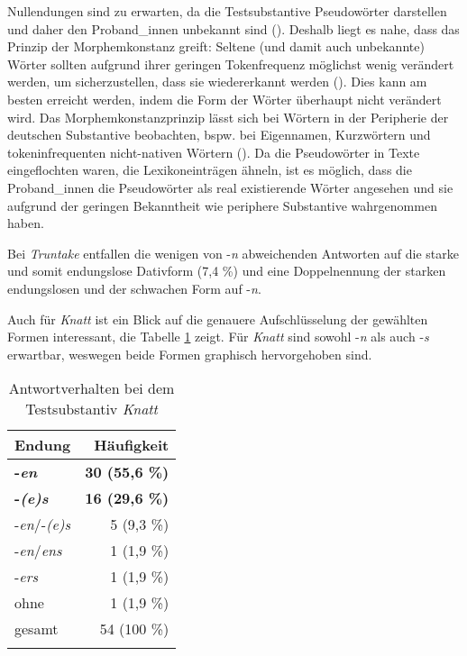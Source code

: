  
Nullendungen sind zu erwarten, da die Testsubstantive Pseudowörter darstellen und daher den Proband\_innen unbekannt sind (\cite[167]{Schmitt.2019}). Deshalb liegt es nahe, dass das Prinzip der Morphemkonstanz greift: Seltene (und damit auch unbekannte) Wörter sollten aufgrund ihrer geringen Tokenfrequenz möglichst wenig verändert werden, um sicherzustellen, dass sie wiedererkannt werden (\cite[150]{Ackermann.2017}). Dies kann am besten erreicht werden, indem die Form der Wörter überhaupt nicht verändert wird.  Das Morphemkonstanzprinzip lässt sich bei Wörtern in der Peripherie der deutschen Substantive beobachten, bspw. bei Eigennamen, Kurzwörtern und tokeninfrequenten nicht-nativen Wörtern (\cite[151--154]{Ackermann.2017}). Da die Pseudowörter in Texte eingeflochten waren, die Lexikoneinträgen ähneln, ist es möglich, dass die Proband\_innen die Pseudowörter als real existierende Wörter angesehen und sie aufgrund der geringen Bekanntheit wie periphere Substantive wahrgenommen haben. 

 
Bei \textit{Truntake} entfallen die wenigen von -\textit{n} abweichenden Antworten auf die starke und somit endungslose Dativform (7,4 \%) und eine Doppelnennung der starken endungslosen und der schwachen Form auf -\textit{n}.



Auch für \textit{Knatt} ist ein Blick auf die genauere Aufschlüsselung der gewählten Formen in\-teres\-sant, die Tabelle \ref{knatt} zeigt. Für \textit{Knatt} sind sowohl -\textit{n} als auch -\textit{s} erwartbar, weswegen beide Formen graphisch hervorgehoben sind. 

\begin{table}
\begin{tabular}{lr}
\lsptoprule
Endung  & Häufigkeit \\ 
\midrule
\textbf{-\textit{en}}  &  \textbf{30 (55,6 \%)} \\
\textbf{-\textit{(e)s}}  &  \textbf{16 (29,6 \%)} \\ 
-\textit{en}/-\textit{(e)s}  &   5 (9,3 \%) \\ 
-\textit{en}/\textit{ens} & 1 (1,9 \%)\\
-\textit{ers}  &   1 (1,9 \%) \\ 
ohne  &   1 (1,9 \%)\\
\midrule
gesamt  & 54 (100 \%) \\
\lspbottomrule
\end{tabular}
\caption{Antwortverhalten bei dem Testsubstantiv \textit{Knatt}}
\label{knatt}
\end{table}

